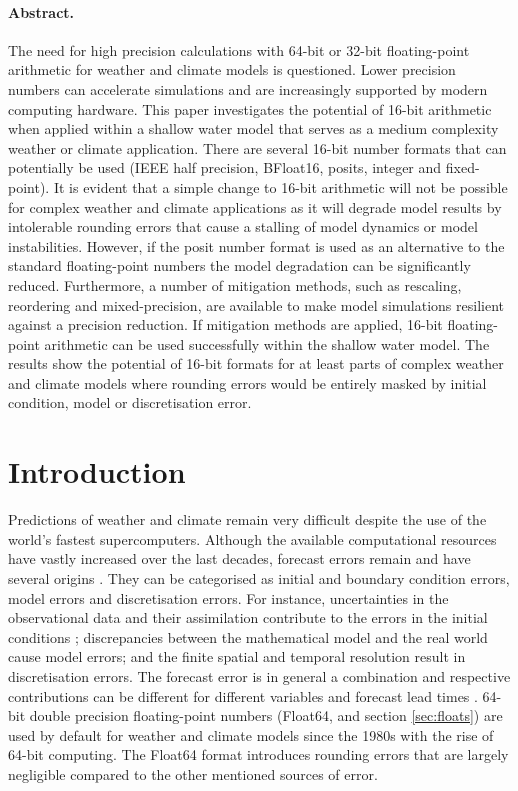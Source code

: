 \paragraph{Abstract.} The need for high precision calculations with 64-bit or 32-bit floating-point arithmetic for weather and
climate models is questioned. Lower precision numbers can accelerate simulations and are increasingly supported
by modern computing hardware. This paper investigates the potential of 16-bit arithmetic when applied within a shallow
water model that serves as a medium complexity weather or climate application. There are several 16-bit number
formats that can potentially be used (IEEE half precision, BFloat16, posits, integer and fixed-point). It is evident that a
simple change to 16-bit arithmetic will not be possible for complex weather and climate applications as it will degrade model
results by intolerable rounding errors that cause a stalling of model dynamics or model instabilities. However, if the posit number
format is used as an alternative to the standard floating-point numbers the model degradation can be significantly reduced.
Furthermore, a number of mitigation methods, such as rescaling, reordering and mixed-precision, are available to make model
simulations resilient against a precision reduction. If mitigation methods are applied, 16-bit floating-point arithmetic can be used
successfully within the shallow water model. The results show the potential of 16-bit formats for at least parts of complex weather
and climate models where rounding errors would be entirely masked by initial condition, model or discretisation error.

\section{Introduction}

Predictions of weather and climate remain very difficult despite the use of the world's fastest supercomputers. Although the available
computational resources have vastly increased over the last decades, forecast errors remain and have several origins
\citep{Palmer2012,Palmer2015}. They can be categorised as initial and boundary condition errors, model errors and discretisation
errors. For instance, uncertainties in the observational data and their assimilation contribute to the errors in the initial conditions
\citep{Ghil1991}; discrepancies between the mathematical model and the real world cause model errors; and the finite spatial and
temporal resolution result in discretisation errors. The forecast error is in general a combination and respective contributions can be
different for different variables and forecast lead times \citep{Jung2010,Palmer2019a}. 64-bit double precision floating-point numbers
(Float64, \cite{IEEE1985} and section \ref{sec:floats}) are used by default for weather and climate models since the 1980s with the
rise of 64-bit computing. The Float64 format introduces rounding errors \citep{Higham2002} that are largely negligible compared
to the other mentioned sources of error.

